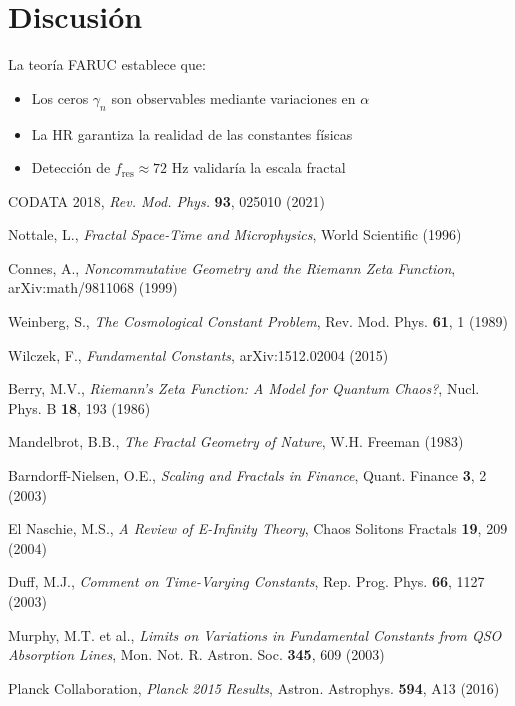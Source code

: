 \documentclass[a4paper, 12pt]{article}
\begin{document}
\section{Discusión}
La teoría FARUC establece que:
\begin{itemize}
\item Los ceros \(\gamma_n\) son observables mediante variaciones en \(\alpha\)
\item La HR garantiza la realidad de las constantes físicas
\item Detección de \(f_{\text{res}} \approx 72\) Hz validaría la escala fractal
\end{itemize}

\begin{thebibliography}{30}
CODATA 2018, \textit{Rev. Mod. Phys.} \textbf{93}, 025010 (2021)

Nottale, L., \textit{Fractal Space-Time and Microphysics}, World Scientific (1996)

Connes, A., \textit{Noncommutative Geometry and the Riemann Zeta Function}, arXiv:math/9811068 (1999)

Weinberg, S., \textit{The Cosmological Constant Problem}, Rev. Mod. Phys. \textbf{61}, 1 (1989)

Wilczek, F., \textit{Fundamental Constants}, arXiv:1512.02004 (2015)

Berry, M.V., \textit{Riemann's Zeta Function: A Model for Quantum Chaos?}, Nucl. Phys. B \textbf{18}, 193 (1986)

Mandelbrot, B.B., \textit{The Fractal Geometry of Nature}, W.H. Freeman (1983)

Barndorff-Nielsen, O.E., \textit{Scaling and Fractals in Finance}, Quant. Finance \textbf{3}, 2 (2003)

El Naschie, M.S., \textit{A Review of E-Infinity Theory}, Chaos Solitons Fractals \textbf{19}, 209 (2004)

Duff, M.J., \textit{Comment on Time-Varying Constants}, Rep. Prog. Phys. \textbf{66}, 1127 (2003)

Murphy, M.T. et al., \textit{Limits on Variations in Fundamental Constants from QSO Absorption Lines}, Mon. Not. R. Astron. Soc. \textbf{345}, 609 (2003)

Planck Collaboration, \textit{Planck 2015 Results}, Astron. Astrophys. \textbf{594}, A13 (2016)


\end{thebibliography}
\end{document}
